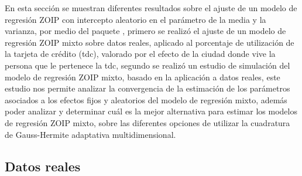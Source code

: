 En esta secci\'{o}n se muestran diferentes resultados sobre el ajuste de un modelo de regresi\'{o}n ZOIP con intercepto aleatorio en el par\'{a}metro de la media y la varianza, por medio del paquete , primero se realiz\'{o} el ajuste de un modelo de regresi\'{o}n ZOIP mixto sobre datos reales, aplicado al porcentaje de utilizaci\'{o}n de la tarjeta de cr\'{e}dito (tdc), valorado por el efecto de la ciudad donde vive la persona que le pertenece la tdc, segundo se realiz\'{o} un estudio de simulaci\'{o}n del modelo de regresi\'{o}n ZOIP mixto, basado en la aplicaci\'{o}n a datos reales, este estudio nos permite analizar la convergencia de la estimaci\'{o}n de los par\'{a}metros  asociados a los efectos fijos y aleatorios del modelo de regresi\'{o}n mixto, adem\'{a}s poder analizar y determinar cu\'{a}l es la mejor alternativa para estimar los modelos de regresi\'{o}n ZOIP mixto, sobre las diferentes opciones de utilizar la cuadratura de Gauss-Hermite adaptativa multidimensional.

\subsection{Datos reales}

